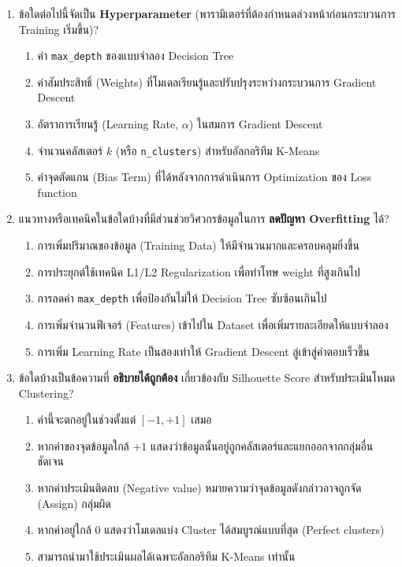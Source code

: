 \documentclass[a4paper,12pt]{article}
\begin{document}
\begin{enumerate}[label=\textbf{\arabic*.},start=6]

\item ข้อใดต่อไปนี้จัดเป็น \textbf{Hyperparameter} (พารามิเตอร์ที่ต้องกำหนดล่วงหน้าก่อนกระบวนการ Training เริ่มขึ้น)?
\begin{enumerate}[label=\alph*.]
    \item ค่า \texttt{max\_depth} ของแบบจำลอง Decision Tree
    \item ค่าสัมประสิทธิ์ (Weights) ที่โมเดลเรียนรู้และปรับปรุงระหว่างกระบวนการ Gradient Descent
    \item อัตราการเรียนรู้ (Learning Rate, $\alpha$) ในสมการ Gradient Descent
    \item จำนวนคลัสเตอร์ $k$ (หรือ \texttt{n\_clusters}) สำหรับอัลกอริทึม K-Means
    \item ค่าจุดตัดแกน (Bias Term) ที่ได้หลังจากการดำเนินการ Optimization ของ Loss function
\end{enumerate}

\item แนวทางหรือเทคนิคในข้อใดบ้างที่มีส่วนช่วยวิศวกรข้อมูลในการ \textbf{ลดปัญหา Overfitting} ได้?
\begin{enumerate}[label=\alph*.]
    \item การเพิ่มปริมาณของข้อมูล (Training Data) ให้มีจำนวนมากและครอบคลุมยิ่งขึ้น
    \item การประยุกต์ใช้เทคนิค L1/L2 Regularization เพื่อทำโทษ weight ที่สูงเกินไป
    \item การลดค่า \texttt{max\_depth} เพื่อป้องกันไม่ให้ Decision Tree ซับซ้อนเกินไป
    \item การเพิ่มจำนวนฟีเจอร์ (Features) เข้าไปใน Dataset เพื่อเพิ่มรายละเอียดให้แบบจำลอง
    \item การเพิ่ม Learning Rate เป็นสองเท่าให้ Gradient Descent ลู่เข้าสู่คำตอบเร็วขึ้น
\end{enumerate}

\item ข้อใดบ้างเป็นข้อความที่ \textbf{อธิบายได้ถูกต้อง} เกี่ยวข้องกับ Silhouette Score สำหรับประเมินโหมด Clustering?
\begin{enumerate}[label=\alph*.]
    \item ค่านี้จะตกอยู่ในช่วงตั้งแต่ $[-1, +1]$ เสมอ
    \item หากค่าของจุดข้อมูลใกล้ $+1$ แสดงว่าข้อมูลนั้นอยู่ถูกคลัสเตอร์และแยกออกจากกลุ่มอื่นชัดเจน
    \item หากค่าประเมินติดลบ (Negative value) หมายความว่าจุดข้อมูลดังกล่าวอาจถูกจัด (Assign) กลุ่มผิด
    \item หากค่าอยู่ใกล้ $0$ แสดงว่าโมเดลแบ่ง Cluster ได้สมบูรณ์แบบที่สุด (Perfect clusters)
    \item สามารถนำมาใช้ประเมินผลได้เฉพาะอัลกอริทึม K-Means เท่านั้น
\end{enumerate}

\end{enumerate}
\end{document}
